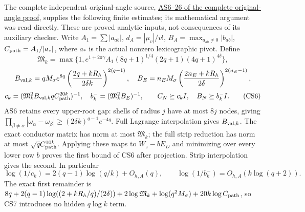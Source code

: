 \documentclass[11pt]{article}
\begin{document}
The complete independent original-angle source, \href{https://github.com/KokunoYumeto/zeta-function-research-reader/blob/9b7b0bad40b33dc88bba7d8cb1548da1fadbb585/workbenches/splitzero-tandem/continuations/20260921-original-angle-word/ANGLE_PROOFS.md}{AS6--26 of the complete original-angle proof}, supplies the following finite estimates; its mathematical argument was read directly. These are proved analytic inputs, not consequences of its auxiliary checker. Write \(A_1=\sum|a_{ab}|\), \(d_A=|\mu_v|/v!\), \(B_A=\max_{a_{ab}\ne0}|b_{ab}|\), \(C_{\rm path}=A_1/|a_*|\), where \(a_*\) is the actual nonzero lexicographic pivot. Define \[
 \mathfrak M_k=\max\{1,e^{1+2\pi\gamma}A_1(8q+1)^{1/4}(2q+1)(4q+1)^{4\delta}\},
\] \[
 B_{{\rm val},k}=qM_\sigma e^{8q}\left(\frac{2q+kR_h}{2\delta k}\right)^{2(q-1)},
 \quad B_E=n_EM_\sigma\left(\frac{2n_E+kR_h}{2\delta}\right)^{2(n_E-1)},
\] \[
 c_k=(\mathfrak M_k^2B_{{\rm val},k}qC_{\rm path}^{20k})^{-1},\quad
 b_k^-=(\mathfrak M_k^2B_E)^{-1},
 \qquad C_N\succeq c_kI,\quad B_N\succeq b_k^-I.
 \tag{CS6}
\] AS6 retains every upper-root gap: shells of radius \(j\) have at most \(8j\) nodes, giving \(\prod_{\beta\ne\alpha}|\omega_\alpha-\omega_\beta|\ge(2\delta k)^{q-1}e^{-4q}\). Full Lagrange interpolation gives \(B_{{\rm val},k}\). The exact conductor matrix has norm at most \(\mathfrak M_k\); the full strip reduction has norm at most \(\sqrt qC_{\rm path}^{10k}\). Applying these maps to \(W_z-bE_D\) and minimizing over every lower row \(b\) proves the first bound of CS6 after projection. Strip interpolation gives the second. In particular \[
 \log(1/c_k)=2(q-1)\log(q/k)+O_{h,A}(q),\qquad
 \log(1/b_k^-)=O_{h,A}(k\log(q+2)).
 \tag{CS7}
\] The exact first remainder is \(8q+2(q-1)\log((2+kR_h/q)/(2\delta))+2\log\mathfrak M_k+\log(q^2M_\sigma)+20k\log C_{\rm path}\), so CS7 introduces no hidden \(q\log k\) term.
\end{document}
